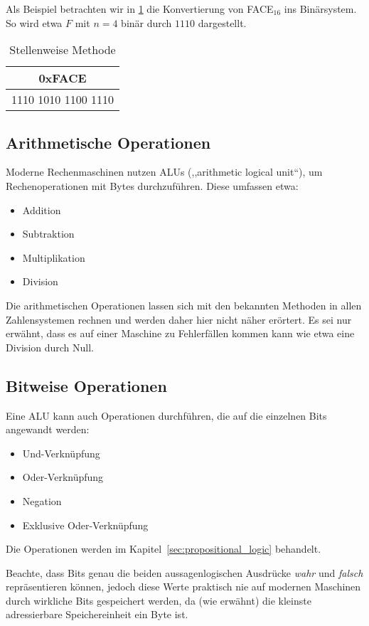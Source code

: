 Als Beispiel betrachten wir in \ref{tab:positional_approach} die
Konvertierung von FACE$_{16}$ ins Binärsystem. So wird etwa $F$
mit $n=4$ binär durch $1110$ dargestellt.
%
\begin{table}[ht]
  \begin{center}
    \begin{tabular}{c}
     \hline
      0xFACE \\
     \hline
      1110 1010 1100 1110
    \end{tabular}
    \caption{Stellenweise Methode}
    \label{tab:positional_approach}
  \end{center}
\end{table}

\subsection{Arithmetische Operationen}
%
Moderne Rechenmaschinen nutzen ALUs (,,arithmetic logical unit``),
um Rechenoperationen mit Bytes durchzuführen. Diese umfassen etwa:
%
\begin{itemize}
 \item Addition
 \item Subtraktion
 \item Multiplikation
 \item Division
\end{itemize}

Die arithmetischen Operationen lassen sich mit den bekannten
Methoden in allen Zahlensystemen rechnen und werden daher hier
nicht näher erörtert. Es sei nur erwähnt, dass es auf einer
Maschine zu Fehlerfällen kommen kann wie etwa eine Division
durch Null.

\subsection{Bitweise Operationen}
%
Eine ALU kann auch Operationen durchführen, die auf die einzelnen Bits
angewandt werden:
%
\begin{itemize}
 \item Und-Verknüpfung
 \item Oder-Verknüpfung
 \item Negation
 \item Exklusive Oder-Verknüpfung
\end{itemize}
%
Die Operationen werden im Kapitel~\ref{sec:propositional_logic}
behandelt.

Beachte, dass Bits genau die beiden aussagenlogischen Ausdrücke
\textsl{wahr} und \textsl{falsch} repräsentieren können, jedoch diese
Werte praktisch nie auf modernen Maschinen durch wirkliche Bits
gespeichert werden, da (wie erwähnt) die kleinste adressierbare
Speichereinheit ein Byte ist.
